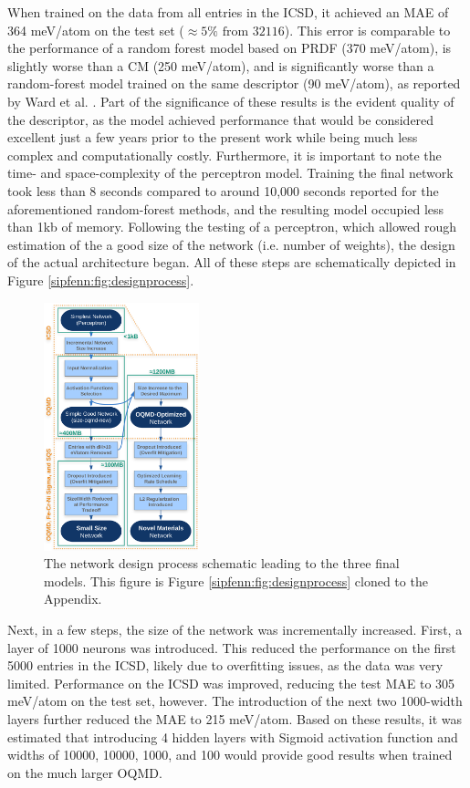 When trained on the data from all entries in the ICSD, it achieved an MAE of 364 meV/atom on the test set ($\approx5\% \text{ from } 32116$). This error is comparable to the performance of a random forest model based on PRDF (370 meV/atom), is slightly worse than a CM (250 meV/atom), and is significantly worse than a random-forest model trained on the same descriptor (90 meV/atom), as reported by Ward et al. \cite{Ward2017IncludingTessellations}. Part of the significance of these results is the evident quality of the descriptor, as the model achieved performance that would be considered excellent just a few years prior to the present work while being much less complex and computationally costly. Furthermore, it is important to note the time- and space-complexity of the perceptron model. Training the final network took less than 8 seconds compared to around 10,000 seconds reported for the aforementioned random-forest methods, and the resulting model occupied less than 1kb of memory. Following the testing of a perceptron, which allowed rough estimation of the a good size of the network (i.e. number of weights), the design of the actual architecture began. All of these steps are schematically depicted in Figure \ref{sipfenn:fig:designprocess}.

\begin{figure}[H]
    \centering
    \includegraphics[width=0.4\textwidth]{sipfenn/SIPFENN_design_updated.png}
    \caption{The network design process schematic leading to the three final models. This figure is Figure \ref{sipfenn:fig:designprocess} cloned to the Appendix.}
\end{figure}

Next, in a few steps, the size of the network was incrementally increased. First, a layer of 1000 neurons was introduced. This reduced the performance on the first 5000 entries in the ICSD, likely due to overfitting issues, as the data was very limited. Performance on the ICSD was improved, reducing the test MAE to 305 meV/atom on the test set, however. The introduction of the next two 1000-width layers further reduced the MAE to 215 meV/atom. Based on these results, it was estimated that introducing 4 hidden layers with Sigmoid activation function and widths of 10000, 10000, 1000, and 100 would provide good results when trained on the much larger OQMD.

